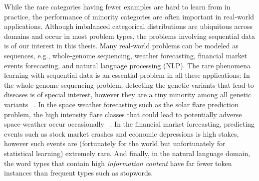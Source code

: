 While the rare categories having fewer examples are hard to learn from in practice, the performance of minority categories are often important in real-world applications. 
Although imbalanced categorical distributions are ubiquitous across domains and occur in most problem types, the problems involving sequential data is of our interest in this thesis.
Many real-world problems can be modeled as sequences, e.g., whole-genome sequencing, weather forecasting, financial market events forecasting, and natural language processing (NLP).
The rare phenomena learning with sequential data is an essential problem in all these applications:
In the whole-genome sequencing problem, detecting the genetic variants that lead to diseases is of special interest, however they are a tiny minority among all genetic variants ~\cite{schubach-2017-imbalance-genome}.
In the space weather forecasting such as the solar flare prediction problem, the high intensity flare classes that could lead to potentially adverse space-weather occur occasionally ~\cite{azim-etal-2019-rare-solar-flare}.
In the financial market forecasting, predicting events such as stock market crashes and economic depressions is high stakes, however such events are (fortunately for the world but unfortunately for statistical learning) extremely rare.
And finally, in the natural language domain, the word types that contain high \textit{information content} have far fewer token instances than frequent types such as stopwords.

